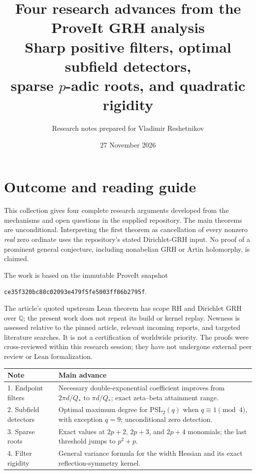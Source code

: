 \documentclass[11pt,a4paper]{article}
\title{\textbf{Four research advances from the ProveIt GRH analysis}\\[8pt]\large Sharp positive filters, optimal subfield detectors,\\ sparse $p$-adic roots, and quadratic rigidity}
\author{Research notes prepared for Vladimir Reshetnikov}
\date{27 November 2026}
\begin{document}
\maketitle

\section*{Outcome and reading guide}
This collection gives four complete research arguments developed from the mechanisms and open questions in the supplied repository. The main theorems are unconditional. Interpreting the first theorem as cancellation of every nonzero \emph{real} zero ordinate uses the repository's stated Dirichlet-GRH input. No proof of a prominent general conjecture, including nonabelian GRH or Artin holomorphy, is claimed.

The work is based on the immutable ProveIt snapshot
\begin{center}\small\texttt{ce35f320bc88c02093e479f5fe5003ff86b2795f}.\end{center}
The article's quoted upstream Lean theorem has scope RH and Dirichlet GRH over $\mathbb Q$; the present work does not repeat its build or kernel replay. Newness is assessed relative to the pinned article, relevant incoming reports, and targeted literature searches. It is not a certification of worldwide priority. The proofs were cross-reviewed within this research session; they have not undergone external peer review or Lean formalization.

\begin{center}\small
\begin{tabularx}{\textwidth}{@{}lX@{}}\toprule
Note & Main advance\\\midrule
1. Endpoint filters & Necessary double-exponential coefficient improves from $2\pi d/Q_*$ to $\pi d/Q_*$; exact zeta--beta attainment range.\\
2. Subfield detectors & Optimal maximum degree for $\mathrm{PSL}_2(q)$ when $q\equiv1\pmod4$, with exception $q=9$; unconditional zero detection.\\
3. Sparse roots & Exact values at $2p+2$, $2p+3$, and $2p+4$ monomials; the last threshold jumps to $p^2+p$.\\
4. Filter rigidity & General variance formula for the width Hessian and its exact reflection-symmetry kernel.\\\bottomrule
\end{tabularx}
\end{center}
\end{document}
